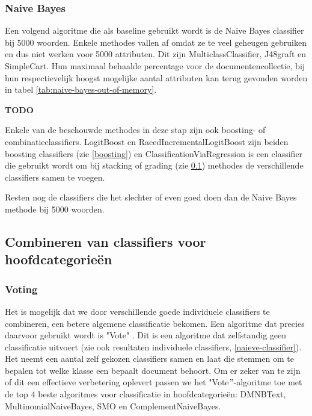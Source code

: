 \subsubsection{Naive Bayes}
Een volgend algoritme die als baseline gebruikt wordt is de Naive Bayes classifier bij 5000 woorden. Enkele methodes vallen af omdat ze te veel geheugen gebruiken en dus niet werken voor 5000 attributen. Dit zijn MulticlassClassifier, J48graft en SimpleCart. Hun maximaal behaalde percentage voor de documentencollectie, bij hun respectievelijk hoogst mogelijke aantal attributen kan terug gevonden worden in tabel \ref{tab:naive-bayes-out-of-memory}.

\textbf{TODO}

Enkele van de beschouwde methodes in deze stap zijn ook boosting- of combinatieclassifiers. LogitBoost en RacedIncrementalLogitBoost zijn beiden boosting classifiers (zie \ref{boosting}) en ClassificationViaRegression is een classifier die gebruikt wordt om bij stacking of grading (zie \ref{combineren-classifiers}) methodes de verschillende classifiers samen te voegen.

Resten nog de classifiers die het slechter of even goed doen dan de Naive Bayes methode bij 5000 woorden.  


\subsection{Combineren van classifiers voor hoofdcategorie\"en}
\label{combineren-classifiers}
\subsubsection{Voting}
Het is mogelijk dat we door verschillende goede individuele classifiers te combineren, een betere algemene classificatie bekomen. Een algoritme dat precies daarvoor gebruikt wordt is "Vote"  \cite{Kittler1998}. Dit is een algoritme dat zelfstandig geen classificatie uitvoert (zie ook resultaten individuele classifiers, \ref{naieve-classifier}). Het neemt een aantal zelf gekozen classifiers samen en laat die stemmen om te bepalen tot welke klasse een bepaalt document behoort. Om er zeker van te zijn of dit een effectieve verbetering oplevert passen we het "Vote$"$-algoritme toe met de top 4 beste algoritmes voor classificatie in hoofdcategorie\"en: DMNBText, MultinomialNaiveBayes, SMO en ComplementNaiveBayes. 


